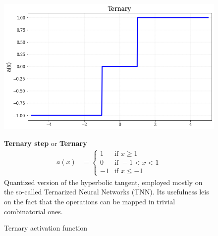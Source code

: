 \begin{figure}[!h]
\begin{minipage}{0.45\textwidth}

    \centering
\includegraphics[width=\textwidth]{sections/03/Images/Ternary.png}
\caption{Ternary activation function}
    \label{fig:act_ter}
\end{minipage}
\hfill
\begin{minipage}{0.5\textwidth}
    \textbf{Ternary step} or \textbf{Ternary}
   \begin{align}
        a(x) &=
        \begin{cases}
        1   & \text{if } x \geq 1 \\
        0   & \text{if } -1 < x < 1 \\
        -1  & \text{if } x \leq -1
        \end{cases}
    \end{align}
   Quantized version of the hyperbolic tangent, employed mostly on the so-called Ternarized Neural Networks (TNN). Its usefulness leis on the fact that the operations can be mapped in trivial combinatorial ones. 
\end{minipage}
\end{figure}  


